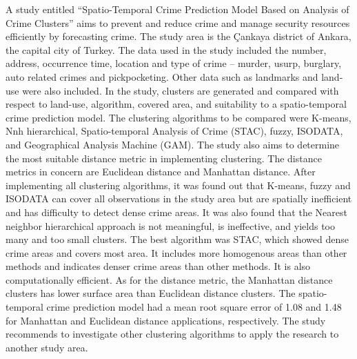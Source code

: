     A study entitled “Spatio-Temporal Crime Prediction Model Based on Analysis of Crime Clusters” \cite{polat2007spatio} aims to prevent and reduce crime and manage security resources efficiently by forecasting crime. The study area is the Çankaya district of Ankara, the capital city of Turkey. The data used in the study included the number, address, occurrence time, location and type of crime – murder, usurp, burglary, auto related crimes and pickpocketing. Other data such as landmarks and land-use were also included. In the study, clusters are generated and compared with respect to land-use, algorithm, covered area, and suitability to a spatio-temporal crime prediction model. The clustering algorithms to be compared were K-means, Nnh hierarchical, Spatio-temporal Analysis of Crime (STAC), fuzzy, ISODATA, and Geographical Analysis Machine (GAM). The study also aims to determine the most suitable distance metric in implementing clustering. The distance metrics in concern are Euclidean distance and Manhattan distance. After implementing all clustering algorithms, it was found out that K-means, fuzzy and ISODATA can cover all observations in the study area but are spatially inefficient and has difficulty to detect dense crime areas. It was also found that the Nearest neighbor hierarchical approach is not meaningful, is ineffective, and yields too many and too small clusters. The best algorithm was STAC, which showed dense crime areas and covers most area. It includes more homogenous areas than other methods and indicates denser crime areas than other methods. It is also computationally efficient. As for the distance metric, the Manhattan distance clusters has lower surface area than Euclidean distance clusters. The spatio-temporal crime prediction model had a mean root square error of 1.08 and 1.48 for Manhattan and Euclidean distance applications, respectively. The study recommends to investigate other clustering algorithms to apply the research to another study area.

